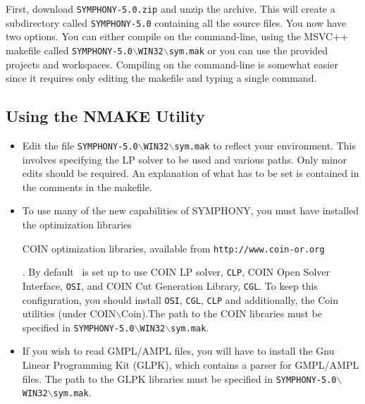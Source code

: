 First, download \texttt{SYMPHONY-5.0.zip} and unzip the archive. This will
create a subdirectory called \texttt{SYMPHONY-5.0} containing all
the source files. You now have two options. You can either compile on the
command-line, using the MSVC++ makefile called
\texttt{SYMPHONY-5.0$\backslash$WIN32$\backslash$sym.mak} or you
can use the provided projects and workspaces. Compiling on the command-line is
somewhat easier since it requires only editing the makefile and typing a
single command.

\subsection{Using the NMAKE Utility}

\begin{itemize}

\item Edit the file
\texttt{SYMPHONY-5.0$\backslash$WIN32$\backslash$sym.mak} to
reflect your environment. This involves specifying the LP solver to be used
and various paths. Only minor edits should be required. An explanation of what
has to be set is contained in the comments in the makefile.

\item To use many of the new capabilities of SYMPHONY, you must have installed
the \emph{} optimization
libraries 
\begin{latexonly} 
COIN optimization libraries, available from
\texttt{http://www.coin-or.org} 
\end{latexonly}. By default \BB\ is 
set up to use COIN LP solver, \texttt{CLP}, COIN Open Solver Interface, 
\texttt{OSI}, and COIN Cut Generation Library, \texttt{CGL}. To keep this 
configuration, you should install \texttt{OSI}, \texttt{CGL}, \texttt{CLP} 
and additionally, the Coin utilities (under COIN$\backslash$Coin).The path to 
the COIN libraries must be specified in 
\texttt{SYMPHONY-5.0$\backslash$WIN32$\backslash$sym.mak}.

\item If you wish to read GMPL/AMPL files, you will have to install the Gnu
Linear Programming Kit (GLPK), which contains a parser for GMPL/AMPL
files. The path to the GLPK libraries must be specified in
\texttt{SYMPHONY-5.0$\backslash$WIN32$\backslash$sym.mak}.


\end{itemize}
